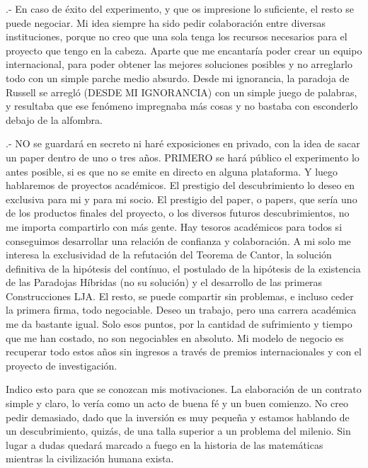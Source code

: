 .- En caso de éxito del experimento, y que os impresione lo suficiente, el resto se puede negociar. Mi idea siempre ha sido pedir colaboración entre diversas instituciones, porque no creo que una sola tenga los recursos necesarios para el proyecto que tengo en la cabeza. Aparte que me encantaría poder crear un equipo internacional, para poder obtener las mejores soluciones posibles y no arreglarlo todo con un simple parche medio absurdo. Desde mi ignorancia, la paradoja de Russell se arregló (DESDE MI IGNORANCIA) con un simple juego de palabras, y resultaba que ese fenómeno impregnaba más cosas y no bastaba con esconderlo debajo de la alfombra.

.- NO se guardará en secreto ni haré exposiciones en privado, con la idea de sacar un paper dentro de uno o tres años. PRIMERO se hará público el experimento lo antes posible, si es que no se emite en directo en alguna plataforma. Y luego hablaremos de proyectos académicos. El prestigio del descubrimiento lo deseo en exclusiva para mi y para mi socio. El prestigio del paper, o papers, que sería uno de los productos finales del proyecto, o los diversos futuros descubrimientos, no me importa compartirlo con más gente. Hay tesoros académicos para todos si conseguimos desarrollar una relación de confianza y colaboración. A mi solo me interesa la exclusividad de la refutación del Teorema de Cantor, la solución definitiva de la hipótesis del contínuo, el postulado de la  hipótesis de la existencia de las Paradojas Híbridas (no su solución) y el desarrollo de las primeras Construcciones LJA. El resto, se puede compartir sin problemas, e incluso ceder la primera firma, todo negociable. Deseo un trabajo, pero una carrera académica me da bastante igual. Solo esos puntos, por la cantidad de sufrimiento y tiempo que me han costado, no son negociables en absoluto. Mi modelo de negocio es recuperar todo estos años sin ingresos a través de premios internacionales y con el proyecto de investigación.

\noindent
Indico esto para que se conozcan mis motivaciones. La elaboración de un contrato simple y claro, lo vería como un acto de buena fé y un buen comienzo. No creo pedir demasiado, dado que la inversión es muy pequeña y estamos hablando de un descubrimiento, quizás, de una talla superior a un problema del milenio. Sin lugar a dudas quedará marcado a fuego en la historia de las matemáticas mientras la civilización humana exista.
 
